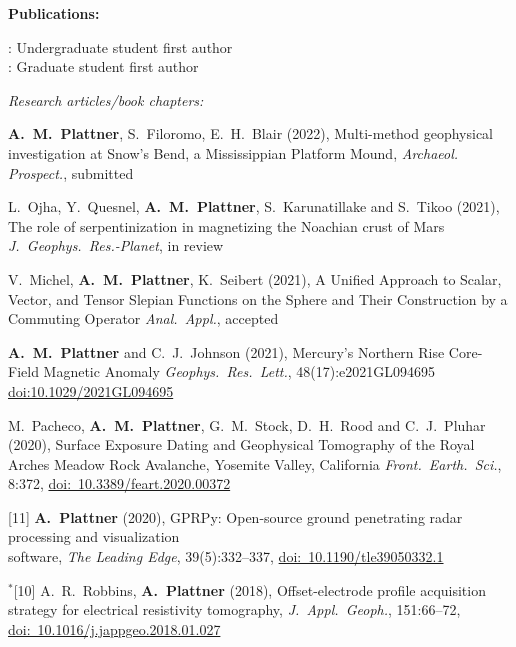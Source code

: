 \documentclass[10pt]{article}
\begin{document}
\spc
\textbf{\tsize Publications:}

\spcp
\ug: Undergraduate student first author\\
\gr: Graduate student first author


\spcp
\emph{Research articles/book chapters:}

\spcp
\textbf{A.~M.~Plattner}, S.~Filoromo, E.~H.~Blair (2022), Multi-method geophysical
investigation at Snow's Bend, a Mississippian Platform Mound,
\emph{Archaeol. Prospect.}, submitted

\spcp
L.~Ojha, Y.~Quesnel, \textbf{A.~M.~Plattner}, S.~Karunatillake and S.~Tikoo (2021),
The role of serpentinization in magnetizing the Noachian crust of Mars
\emph{J.~Geophys.~Res.-Planet}, in review

\spcp
\shift[14] V.~Michel, \textbf{A.~M.~Plattner}, K.~Seibert (2021),
A Unified Approach to Scalar, Vector, and Tensor Slepian Functions on the Sphere and Their Construction by a Commuting Operator
\emph{Anal.~Appl.}, accepted

\spcp
\shift[13] \textbf{A.~M.~Plattner} and C.~J.~Johnson (2021),
Mercury's Northern Rise Core-Field Magnetic Anomaly
\emph{Geophys.~Res.~Lett.}, 48(17):e2021GL094695 \href{https://doi.org/10.1029/2021GL094695}{doi:10.1029/2021GL094695}

\spcp
\grshift \gr[12] M.~Pacheco, \textbf{A.~M.~Plattner}, G.~M.~Stock, D.~H.~Rood and C.~J.~Pluhar (2020),
Surface Exposure Dating and Geophysical Tomography of the Royal Arches Meadow Rock Avalanche, Yosemite Valley, California
\emph{Front.~Earth.~Sci.}, 8:372, \href{https://www.frontiersin.org/articles/10.3389/feart.2020.00372/full}{doi:~10.3389/feart.2020.00372} 

\spcp
\hspace{-0.675cm}[11] \textbf{A.~Plattner} (2020), GPRPy: Open-source ground penetrating radar processing and visualization \\software, \emph{The Leading Edge}, 39(5):332--337, \href{https://doi.org/10.1190/tle39050332.1}{doi:~10.1190/tle39050332.1}

\spcp
\hspace{-0.835cm}$^*$[10] A.~R.~Robbins, \textbf{A.~Plattner} (2018),
Offset-electrode profile acquisition strategy for
electrical resistivity tomography,
\emph{J.~Appl.~Geoph.}, 151:66--72, \href{https://www.sciencedirect.com/science/article/pii/S0926985117308376?via%3Dihub}{doi:~10.1016/j.jappgeo.2018.01.027} 
\end{document}
